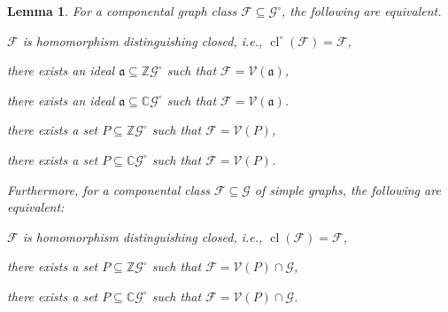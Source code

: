 \documentclass[11pt]{scrartcl}
\theoremstyle{definition}
\theoremstyle{plain}
\newtheorem{lemma}[definition]{Lemma}
\theoremstyle{remark}
\DeclareMathOperator{\cl}{cl}
\newcommand{\lG}{\mathcal{G}^\circ}
\newcommand{\G}{\mathcal{G}}
\begin{document}
    \begin{lemma}\label{lem:closed-to-vanishing-looped}
        For a componental graph class $\mathcal{F} \subseteq \lG$, the following are equivalent.
        \begin{assertions}
            \item\label{it:ctv1} $\mathcal{F}$ is homomorphism distinguishing closed, i.e., $\cl^\circ(\mathcal{F}) = \mathcal{F}$,
            \item\label{it:ctv2} there exists an ideal $\mathfrak{a} \subseteq \mathbb{Z}\lG$ such that $\mathcal{F} = \mathcal{V}(\mathfrak{a})$,
            \item\label{it:ctv3} there exists an ideal $\mathfrak{a} \subseteq \mathbb{C}\lG$ such that $\mathcal{F} = \mathcal{V}(\mathfrak{a})$.
			\item\label{it:ctv4} there exists a set $P \subseteq \mathbb{Z}\lG$ such that $\mathcal{F} = \mathcal{V}(P)$,
            \item\label{it:ctv5} there exists a set $P \subseteq \mathbb{C}\lG$ such that $\mathcal{F} = \mathcal{V}(P)$.
        
		\end{assertions}
		Furthermore, for a componental class $\mathcal{F} \subseteq \G$ of simple graphs, the following are equivalent:
		\begin{assertions}[resume]
			\item\label{it:ctv6} $\mathcal{F}$ is homomorphism distinguishing closed, i.e., $\cl(\mathcal{F}) = \mathcal{F}$,
			\item\label{it:ctv7} there exists a set $P \subseteq \mathbb{Z}\lG$ such that $\mathcal{F} = \mathcal{V}(P) \cap \G$,
			\item\label{it:ctv8} there exists a set $P \subseteq \mathbb{C}\lG$ such that $\mathcal{F} = \mathcal{V}(P) \cap \G$.
		\end{assertions}
    \end{lemma}
\end{document}
